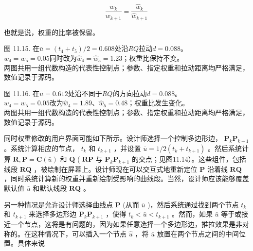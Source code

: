 \documentclass[../main.tex]{subfiles}
\begin{document}
\[
\frac{{w}_{k}}{{w}_{k + 1}} = \frac{{\widehat{w}}_{k}}{{\widehat{w}}_{k + 1}}
\]

也就是说，权重的比率被保留。

\begin{center}
\begin{minipage}{26cm}
\centering
{}
\par\smallskip
图 11.15. 在$\bar u=(t_4+t_5)/2=0.608$处沿$RQ$拉动$d=0.088$。\\
$w_4=w_5=0.05$同时改为$\widehat w_4=\widehat w_5=1.23$；权重比保持不变。\\
两图共用一组代数构造的代表性控制点；参数、指定权重和拉动距离均严格满足，数值记录于源码。
\end{minipage}
\end{center}

\begin{center}
\begin{minipage}{26cm}
\centering
{}
\par\smallskip
图 11.16. 在$\bar u=0.612$处沿不同于$RQ$的方向拉动$d=0.088$。\\
$w_4=w_5=0.05$改为$\widehat w_4=1.89$、$\widehat w_5=0.48$；权重比发生变化。\\
两图共用一组代数构造的代表性控制点；参数、指定权重和拉动距离均严格满足，数值记录于源码。
\end{minipage}
\end{center}

同时权重修改的用户界面可能如下所示。设计师选择一个控制多边形边， \({\mathbf{P}}_{k}{\mathbf{P}}_{k + 1}\) 。系统计算相应的节点， \({t}_{k}\) 和 \({t}_{k + 1}\) ，并设置 \(\bar{u} = 1/2\left( {{t}_{k} + {t}_{k + 1}}\right)\) 。然后系统计算 \(\mathbf{R},\mathbf{P} = \mathbf{C}\left( \bar{u}\right)\) 和 \(\mathbf{Q}\) ( \(\mathbf{{RP}}\) 与 \({\mathbf{P}}_{k}{\mathbf{P}}_{k + 1}\) 的交点；见图11.14）。这些组件，包括线段 \(\mathbf{{RQ}}\) ，被绘制在屏幕上。设计师现在可以交互式地重新定位 \(\mathbf{P}\) 沿着线 \(\mathbf{{RQ}}\) ，同时系统计算新的权重并重新绘制受影响的曲线段。当然，设计师应该能够覆盖默认值 \(\bar{u}\) 和默认线段 \(\mathbf{{RQ}}\) 。

另一种情况是允许设计师选择曲线点 \(\mathbf{P}\) (从而 \(\bar{u}\) )，然后系统通过找到两个节点 \({t}_{k}\) 和 \({t}_{k + 1}\) 来选择多边形边 \({\mathbf{P}}_{k}{\mathbf{P}}_{k + 1}\) ，使得 \({t}_{k} < \bar{u} < {t}_{k + 1}\) 。然而，如果 \(\bar{u}\) 等于或接近一个节点，这将是有问题的，因为如果任意选择一个多边形边，推拉效果是非对称的。在这种情况下，可以插入一个节点 \(\widehat{u}\) ，将 \(\bar{u}\) 放置在两个节点之间的中间位置。具体来说
\end{document}
